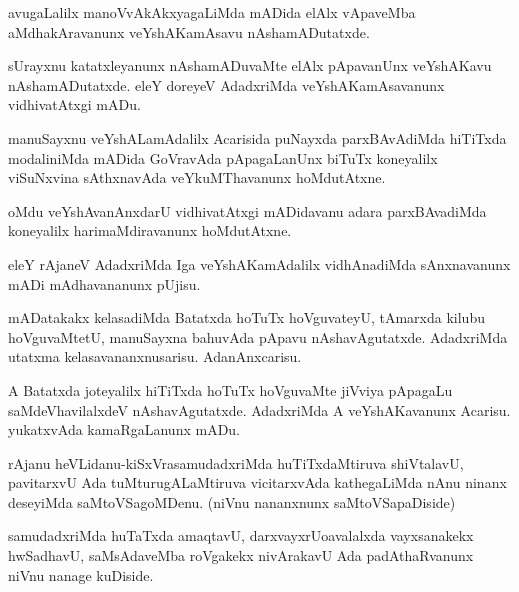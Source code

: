 \documentclass{article}
\begin{document}
\begin{mn}%
avugaLalilx manoVvAkAkxyagaLiMda mADida elAlx vApaveMba aMdhakAravanunx veYshAKamAsavu 
nAshamADutatxde.
\end{mn}

\begin{mn}%
sUrayxnu katatxleyanunx nAshamADuvaMte elAlx pApavanUnx veYshAKavu nAshamADutatxde. eleY 
doreyeV AdadxriMda veYshAKamAsavanunx vidhivatAtxgi mADu.
\end{mn}

\begin{mn}%
manuSayxnu veYshALamAdalilx Acarisida puNayxda parxBAvAdiMda hiTiTxda modaliniMda mADida 
GoVravAda pApagaLanUnx biTuTx koneyalilx viSuNxvina sAthxnavAda veYkuMThavanunx 
hoMdutAtxne.
\end{mn}

\begin{mn}%
oMdu veYshAvanAnxdarU vidhivatAtxgi mADidavanu adara parxBAvadiMda koneyalilx 
harimaMdiravanunx hoMdutAtxne.
\end{mn}

\begin{mn}%
eleY rAjaneV AdadxriMda Iga veYshAKamAdalilx vidhAnadiMda sAnxnavanunx mADi mAdhavananunx 
pUjisu.
\end{mn}

\begin{mn}%
mADatakakx kelasadiMda Batatxda hoTuTx hoVguvateyU, tAmarxda kilubu hoVguvaMtetU, 
manuSayxna bahuvAda pApavu nAshavAgutatxde. AdadxriMda utatxma kelasavananxnusarisu. 
AdanAnxcarisu.
\end{mn}

\begin{mn}%
A Batatxda joteyalilx hiTiTxda hoTuTx hoVguvaMte jiVviya pApagaLu saMdeVhavilalxdeV 
nAshavAgutatxde. AdadxriMda A veYshAKavanunx Acarisu. yukatxvAda kamaRgaLanunx mADu.
\end{mn}


\begin{mn}%
rAjanu heVLidanu-kiSxVrasamudadxriMda huTiTxdaMtiruva shiVtalavU, pavitarxvU Ada 
tuMturugALaMtiruva vicitarxvAda kathegaLiMda nAnu ninanx deseyiMda saMtoVSagoMDenu. (niVnu 
nananxnunx saMtoVSapaDiside) 
\end{mn}

\begin{mn}%
samudadxriMda huTaTxda amaqtavU, darxvayxrUoavalalxda vayxsanakekx hwSadhavU, saMsAdaveMba 
roVgakekx nivArakavU Ada padAthaRvanunx niVnu nanage kuDiside.
\end{mn}
\end{document}
